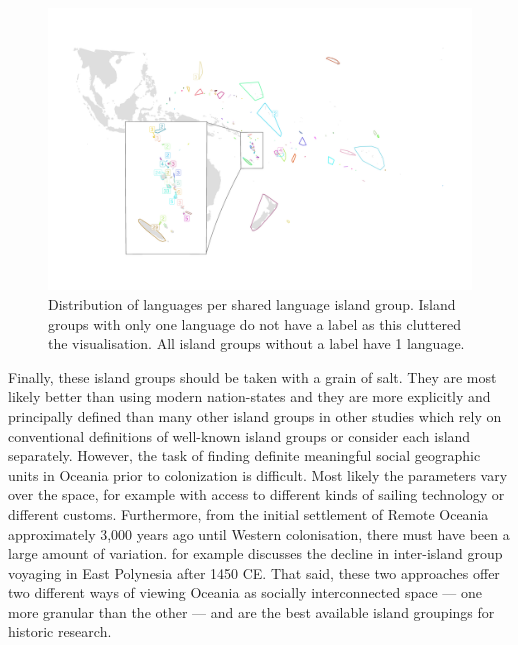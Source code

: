 \documentclass[unnumsec,webpdf,modern,medium]{oup-authoring-template}
\begin{document}
\begin{appendices}
\begin{figure}
\centering
\includegraphics[width=\textwidth]{polygon_medium_group_map_vanuatu_mh_inset.png}
\caption{{Distribution of languages per shared language island group. Island groups with only one language do not have a label as this cluttered the visualisation. All island groups without a label have 1 language.}}
\label{polygon_plot_medium}
\end{figure}

Finally, these island groups should be taken with a grain of salt. They are most likely better than using modern nation-states and they are more explicitly and principally defined than many other island groups in other studies which rely on conventional definitions of well-known island groups or consider each island separately. However, the task of finding definite meaningful social geographic units in Oceania prior to colonization is difficult. Most likely the parameters vary over the space, for example with access to different kinds of sailing technology or different customs. Furthermore, from the initial settlement of Remote Oceania approximately 3,000 years ago until Western colonisation, there must have been a large amount of variation. \citep{rolett2002voyaging} for example discusses the decline in inter-island group voyaging in East Polynesia after 1450 CE. That said, these two approaches offer two different ways of viewing Oceania as socially interconnected space --- one more granular than the other --- and are the best available island groupings for historic research.




\end{appendices}
\end{document}
